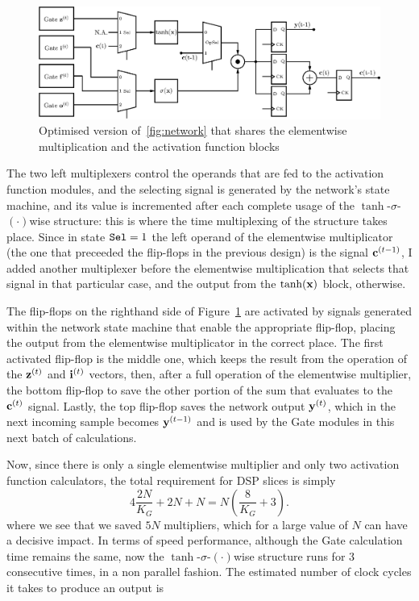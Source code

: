 \begin{figure}
    \centering
    \includegraphics[width=0.9\linewidth]{figures/network-opt.eps}
    \caption[Optimised version of~\ref{fig:network} that shares the elementwise multiplication and the activation function blocks]{Optimised version of~\ref{fig:network} that shares the elementwise multiplication and the activation function blocks}
    \label{fig:network-opt}
\end{figure}
The two left multiplexers control the operands that are fed to the activation function modules, and the selecting signal is generated by the network's state machine, and its value is incremented after each complete usage of the $\tanh$-$\sigma$-$(\cdot)$wise  structure: this is where the time multiplexing of the structure takes place. Since in state $\verb+Sel+=1$ the left operand of the elementwise multiplicator (the one that preceeded the flip-flops in the previous design) is the signal $\mathbf{c}^{(t-1)}$, I added another multiplexer before the elementwise multiplication that selects that signal in that particular case, and the output from the $\tanh(\mathbf{x})$ block, otherwise.

The flip-flops on the righthand side of Figure~\ref{fig:network-opt} are activated by signals generated within the network state machine that enable the appropriate flip-flop, placing the output from the elementwise multiplicator in the correct place. The first activated flip-flop is the middle one, which keeps the result from the operation of the $\mathbf{z}^{(t)}$ and $\mathbf{i}^{(t)}$ vectors, then, after a full operation of the elementwise multiplier, the bottom flip-flop to save the other portion of the sum that evaluates to the $\mathbf{c}^{(t)}$ signal. Lastly, the top flip-flop saves the network output $\mathbf{y}^{(t)}$, which in the next incoming sample becomes $\mathbf{y}^{(t-1)}$ and is used by the Gate modules in this next batch of calculations.

Now, since there is only a single elementwise multiplier and only two activation function calculators, the total requirement for DSP slices is simply
\begin{equation}\label{eq:numdsp_network-opt}
    4\frac{2N}{K_G} + 2N + N = N \left( \frac{8}{K_G} + 3 \right).
\end{equation}
where we see that we saved $5N$ multipliers, which for a large value of $N$ can have a decisive impact. In terms of speed performance, although the Gate calculation time remains the same, now the $\tanh$-$\sigma$-$(\cdot)$wise structure runs for 3 consecutive times, in a non parallel fashion. The estimated number of clock cycles it takes to produce an output is

